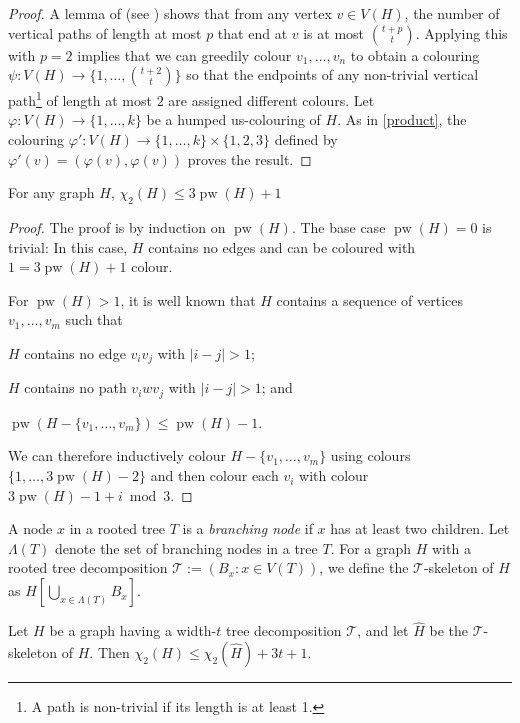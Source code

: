 \documentclass[kpfonts]{patmorin}
\DeclareMathOperator{\pw}{pw}
\newcommand{\uqs}{\chi_2}
\begin{document}
\begin{proof}
    A lemma of \citet{pilipczuk.siebertz:polynomial} (see \cite[Lemma~13]{pilipczuk.siebertz:polynomial-arxiv}) shows that from any vertex $v\in V(H)$, the number of vertical paths of length at most $p$ that end at $v$ is at most $\binom{t+p}{t}$.  Applying this with $p=2$ implies that we can greedily colour $v_1,\ldots,v_n$ to obtain a colouring $\psi:V(H)\to \{1,\ldots,\binom{t+2}{t}\}$ so that the endpoints of any non-trivial vertical path\footnote{A path is non-trivial if its length is at least 1.} of length at most $2$ are assigned different colours.  Let $\varphi:V(H)\to\{1,\ldots,k\}$ be a humped us-colouring of $H$.  As in \cref{product}, the colouring $\varphi':V(H)\to\{1,\ldots,k\}\times \{1,2,3\}$ defined by $\varphi'(v)=(\varphi(v),\varphi(v))$ proves the result.
\end{proof}


\begin{lem}\label{pathwidth}
    For any graph $H$, $\uqs(H)\le 3\pw(H) + 1$
\end{lem}

\begin{proof}
    The proof is by induction on $\pw(H)$.  The base case $\pw(H)=0$ is trivial: In this case, $H$ contains no edges and can be coloured with $1 = 3\pw(H)+1$ colour.

    For $\pw(H)>1$, it is well known that $H$ contains a sequence of vertices $v_1,\ldots,v_m$  such that
    \begin{inparaenum}
        \item $H$ contains no edge $v_iv_j$ with $|i-j|>1$;
        \item $H$ contains no path $v_iw v_j$ with $|i-j|>1$; and
        \item $\pw(H-\{v_1,\ldots,v_m\})\le \pw(H)-1$.
    \end{inparaenum}
    We can therefore inductively colour $H-\{v_1,\ldots,v_m\}$ using colours $\{1,\ldots,3\pw(H)-2\}$ and then colour each $v_i$ with colour $3\pw(H)-1+i\bmod 3$.
\end{proof}

A node $x$ in a rooted tree $T$ is a \emph{branching node} if $x$ has at least two children.  Let $\Lambda(T)$ denote the set of branching nodes in a tree $T$. For a graph $H$ with a rooted tree decomposition $\mathcal{T}:=(B_x:x\in V(T))$, we define the $\mathcal{T}$-skeleton of $H$ as $H[\bigcup_{x\in \Lambda(T)} B_x]$.

\begin{lem}\label{skeleton-colour}
    Let $H$ be a graph having a width-$t$ tree decomposition $\mathcal{T}$, and let $\hat{H}$ be the $\mathcal{T}$-skeleton of $H$.  Then $\uqs(H)\le \uqs(\hat{H}) + 3t+1$.
\end{lem}
\end{document}
